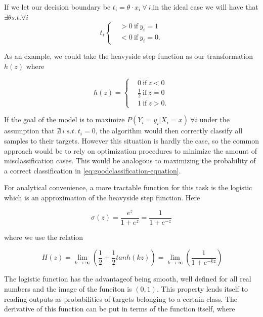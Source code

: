 If we let our decision boundary be $ t_i = \theta \cdot x_i  \ \forall \ i $,in the ideal case we will have that $\exists \theta s.t. \forall i $
\[
t_i
\begin{cases}
&>0 \ \mbox{if} \ y_i=1 \\
&<0 \ \mbox{if} \ y_i=0.
\end{cases}
\]

As an example, we could take the heavyside step function as our transformation $h(z)$  where

\[
h(z) =
\begin{cases}
&0 \ \mbox{if} \ z<0 \\
&\frac{1}{2} \ \mbox{if} \  z=0 \\
&1 \ \mbox{if} \  z>0.
\end{cases}
\]

If the goal of the model is to maximize $P(Y_i = y_i | X_i = x) \ \forall i$
under the assumption that $\nexists\  i \  s.t. \ t_i = 0$, the algorithm would then correctly classify all samples to their targets. However this situation is hardly the case, so the common approach would be to rely on optimization procedures to minimize the amount of misclassification cases. This would be analogous to maximizing the probability of a correct classification in  \ref{eq:goodclassification-equation}.

For analytical convenience, a more tractable function for this task is the logistic which is an approximation of the heavyside step function. Here

\begin{equation} \label{eq:logisticFunction}
\sigma(z)  = \frac{e^{z}}{1 + e^{z}} = \frac{1}{1 + e^{-z}}
\end{equation}

where  we use the relation

\begin{equation}
 \  H(z) = \lim_{k \to \infty} \left(\frac{1}{2} + \frac{1}{2}tanh(kz) \right) = \lim_{k \to \infty} \left(\frac{1}{1+e^{-kz}} \right)
\end{equation}

The logistic function has the advantageof being smooth, well defined for all real numbers and the image of the funciton is $(0,1)$. This property lends itself to reading outputs as probabilities of targets belonging to a certain class. The derivative of this function can be put in terms of the function itself, where

